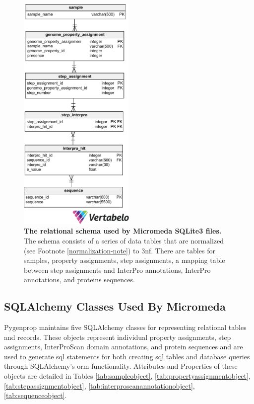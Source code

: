 \begin{figure}[!ht]
  \centering
	\includegraphics[width=0.50\textwidth]{media/micromeda_schema.pdf}
	 \caption[The relational schema used by Micromeda SQLite3 files.]{\textbf{The 
relational schema used by Micromeda SQLite3 files.} The schema consists of a 
series of data tables that are normalized (see Footnote 
\ref{normalization-note}) to \gls{3nf}. There are tables for samples, property 
assignments, step assignments, a mapping table between step assignments and 
InterPro annotations, InterPro annotations, and proteins sequences.}
	 \label{fig:micromedaschema}
\end{figure}

\FloatBarrier
\subsection{SQLAlchemy Classes Used By Micromeda} \label{sqlalchemy-classes}

Pygenprop maintains five SQLAlchemy classes for representing relational tables 
and records. These objects represent individual property assignments, step 
assignments, InterProScan domain annotations, and protein sequences and are 
used to generate \gls{sql} statements for both creating \gls{sql} tables and 
database queries through SQLAlchemy's \gls{orm} functionality. Attributes and 
Properties of these objects are detailed in Tables \ref{tab:sampleobject}, 
\ref{tab:propertyassignmentobject}, \ref{tab:stepassignmentobject}, 
\ref{tab:interproscanannotationobject}, \ref{tab:sequenceobject}.

